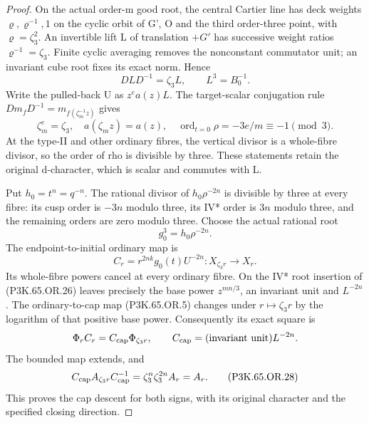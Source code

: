 \begin{proof}
On the actual order-m good root, the central Cartier line has
deck weights \(\varrho,\varrho^{-1},1\) on the cyclic orbit
of G', O and the third order-three point, with
\(\varrho=\zeta_3^2\). An invertible lift L of translation
\(+G'\) has successive weight ratios \(\varrho^{-1}=\zeta_3\).
Finite cyclic averaging removes the nonconstant commutator unit;
an invariant cube root fixes its exact norm. Hence
\[
                    DLD^{-1}=\zeta_3 L,\qquad
                    L^3=B_0^{-1}.
\]
Write the pulled-back U as \(z^e a(z)L\). The target-scalar
conjugation rule \(D m_fD^{-1}=m_{f(\zeta_m^{-1}z)}\) gives
\[
 \zeta_m^e=\zeta_3,\quad a(\zeta_mz)=a(z),\quad
 \operatorname{ord}_{t=0}\rho=-3e/m\equiv-1\pmod3.  \tag{P3K.65.OR.26}
\]
At the type-II and other ordinary fibres, the vertical divisor
is a whole-fibre divisor, so the order of rho is divisible by
three. These statements retain the original d-character, which
is scalar and commutes with L.

Put \(h_0=t^n=q^{-n}\). The rational divisor of
\(h_0\rho^{-2n}\) is divisible by three at every fibre: its
cusp order is \(-3n\) modulo three, its IV* order is \(3n\)
modulo three, and the remaining orders are zero modulo three.
Choose the actual rational root
\[
                     g_0^3=h_0\rho^{-2n}.
\]
The endpoint-to-initial ordinary map is
\[
 C_r=r^{2nk}g_0(t)U^{-2n}:X_{\zeta_3r}\longrightarrow X_r.
                                                               \tag{P3K.65.OR.27}
\]
Its whole-fibre powers cancel at every ordinary fibre. On the
IV* root insertion of (P3K.65.OR.26) leaves precisely the base power
\(z^{mn/3}\), an invariant unit and \(L^{-2n}\).
The ordinary-to-cap map (P3K.65.OR.5) changes under
\(r\mapsto\zeta_3r\) by the logarithm of that positive base
power. Consequently its exact square is
\[
 \Phi_r C_r=C_{\rm cap}\Phi_{\zeta_3r},\qquad
 C_{\rm cap}=(\text{invariant unit})L^{-2n}.
\]
The bounded map extends, and
\[
 C_{\rm cap}A_{\zeta_3r}C_{\rm cap}^{-1}
       =\zeta_3^n\zeta_3^{2n}A_r=A_r.               \tag{P3K.65.OR.28}
\]
This proves the cap descent for both signs, with its original
character and the specified closing direction.


\end{proof}
